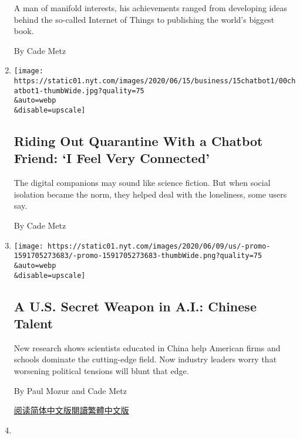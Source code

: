 \begin{enumerate}
  A man of manifold interests, his achievements ranged from developing
  ideas behind the so-called Internet of Things to publishing the
  world's biggest book.

  By Cade Metz
\item
  \href{/2020/06/16/technology/chatbots-quarantine-coronavirus.html}{}

  \texttt{[image: https://static01.nyt.com/images/2020/06/15/business/15chatbot1/00chatbot1-thumbWide.jpg?quality=75\\\&auto=webp\\\&disable=upscale]}

  \hypertarget{riding-out-quarantine-with-a-chatbot-friend-i-feel-very-connected}{%
  \subsection{Riding Out Quarantine With a Chatbot Friend: `I Feel Very
  Connected'}\label{riding-out-quarantine-with-a-chatbot-friend-i-feel-very-connected}}

  The digital companions may sound like science fiction. But when social
  isolation became the norm, they helped deal with the loneliness, some
  users say.

  By Cade Metz
\item
  \href{/2020/06/09/technology/china-ai-research-education.html}{}

  \texttt{[image: https://static01.nyt.com/images/2020/06/09/us/-promo-1591705273683/-promo-1591705273683-thumbWide.png?quality=75\\\&auto=webp\\\&disable=upscale]}

  \hypertarget{a-us-secret-weapon-in-ai-chinese-talent}{%
  \subsection{A U.S. Secret Weapon in A.I.: Chinese
  Talent}\label{a-us-secret-weapon-in-ai-chinese-talent}}

  New research shows scientists educated in China help American firms
  and schools dominate the cutting-edge field. Now industry leaders
  worry that worsening political tensions will blunt that edge.

  By Paul Mozur and Cade Metz

  \href{https://cn.nytimes.com/technology/20200610/china-ai-research-education/}{阅读简体中文版}\href{https://cn.nytimes.com/technology/20200610/china-ai-research-education/zh-hant/}{閱讀繁體中文版}
\item
  \href{/2020/06/03/business/pilgrims-pride-chicken-price-fixing.html}{}


\end{enumerate}
